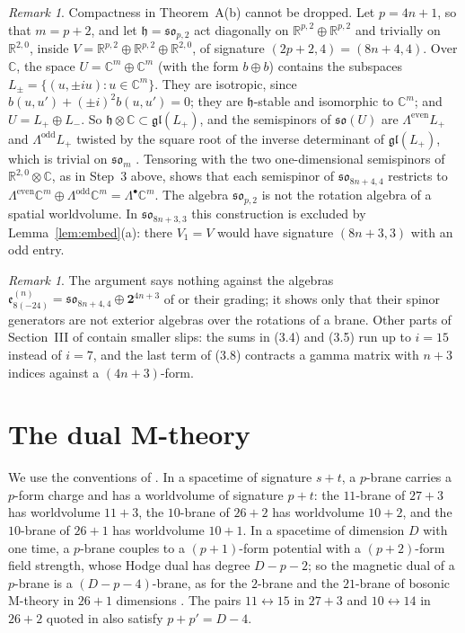\documentclass[11pt]{amsart}
\theoremstyle{remark}
\newtheorem{remark}[theorem]{Remark}
\newcommand{\so}{\mathfrak{so}}
\newcommand{\h}{\mathfrak{h}}
\newcommand{\R}{\mathbb{R}}
\newcommand{\C}{\mathbb{C}}
\begin{document}
\begin{remark}\label{rem:noncompact}
Compactness in Theorem~A(b) cannot be dropped. Let $p=4n+1$, so that $m=p+2$, and let $\h=\so_{p,2}$ act diagonally on $\R^{p,2}\oplus\R^{p,2}$ and trivially on $\R^{2,0}$, inside $V=\R^{p,2}\oplus\R^{p,2}\oplus\R^{2,0}$, of signature $(2p+2,4)=(8n+4,4)$. Over $\C$, the space $U=\C^m\oplus\C^m$ (with the form $b\oplus b$) contains the subspaces $L_\pm=\{(u,\pm iu):u\in\C^m\}$. They are isotropic, since $b(u,u')+(\pm i)^2b(u,u')=0$; they are $\h$-stable and isomorphic to $\C^m$; and $U=L_+\oplus L_-$. So $\h\otimes\C\subset\mathfrak{gl}(L_+)$, and the semispinors of $\so(U)$ are $\Lambda^{\mathrm{even}}L_+$ and $\Lambda^{\mathrm{odd}}L_+$ twisted by the square root of the inverse determinant of $\mathfrak{gl}(L_+)$, which is trivial on $\so_m$ \cite[\S 20.1]{FH91}. Tensoring with the two one-dimensional semispinors of $\R^{2,0}\otimes\C$, as in Step~3 above, shows that each semispinor of $\so_{8n+4,4}$ restricts to $\Lambda^{\mathrm{even}}\C^m\oplus\Lambda^{\mathrm{odd}}\C^m=\Lambda^\bullet\C^m$. The algebra $\so_{p,2}$ is not the rotation algebra of a spatial worldvolume. In $\so_{8n+3,3}$ this construction is excluded by Lemma~\ref{lem:embed}(a): there $V_1=V$ would have signature $(8n+3,3)$ with an odd entry.
\end{remark}

\begin{remark}
The argument says nothing against the algebras $\mathfrak{e}_{8(-24)}^{(n)}=\so_{8n+4,4}\oplus\mathbf{2}^{4n+3}$ of \cite{TMRG25} or their grading; it shows only that their spinor generators are not exterior algebras over the rotations of a brane. Other parts of Section~III of \cite{RMC20} contain smaller slips: the sums in (3.4) and (3.5) run up to $i=15$ instead of $i=7$, and the last term of (3.8) contracts a gamma matrix with $n+3$ indices against a $(4n+3)$-form.
\end{remark}

\section{The dual M-theory}\label{sec:dual}

We use the conventions of \cite{RMC20}. In a spacetime of signature $s+t$, a $p$-brane carries a $p$-form charge and has a worldvolume of signature $p+t$: the $11$-brane of $27+3$ has worldvolume $11+3$, the $10$-brane of $26+2$ has worldvolume $10+2$, and the $10$-brane of $26+1$ has worldvolume $10+1$. In a spacetime of dimension $D$ with one time, a $p$-brane couples to a $(p+1)$-form potential with a $(p+2)$-form field strength, whose Hodge dual has degree $D-p-2$; so the magnetic dual of a $p$-brane is a $(D-p-4)$-brane, as for the $2$-brane and the $21$-brane of bosonic M-theory in $26+1$ dimensions \cite{HS01}. The pairs $11\leftrightarrow15$ in $27+3$ and $10\leftrightarrow14$ in $26+2$ quoted in \cite{RMC20} also satisfy $p+p'=D-4$.
\end{document}

